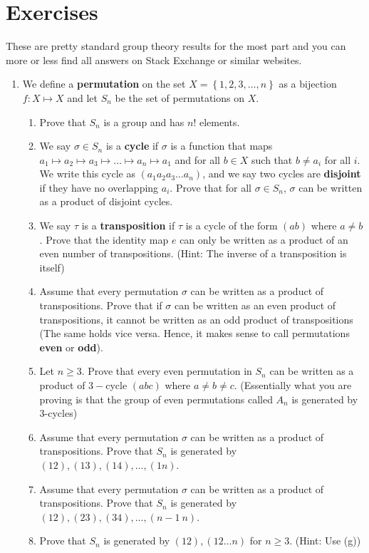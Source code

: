\documentclass[letterpaper,12pt]{article}
\newcommand{\set}[1]{\left\{ #1 \right\}}
\begin{document}
\section{Exercises}
These are pretty standard group theory results for the most part and you can more or less find all answers on Stack Exchange or similar websites.
\begin{enumerate}
    \item We define a \textbf{permutation} on the set $X=\set{1,2,3,\ldots,n}$ as a bijection $f: X \mapsto X$ and let $S_n$ be the set of permutations on $X$. \begin{enumerate}
    \item Prove that $S_n$ is a group and has $n!$ elements.
    \item We say $\sigma \in S_n$ is a \textbf{cycle} if $\sigma$ is a function that maps $a_1 \mapsto a_2 \mapsto a_3 \mapsto \ldots \mapsto a_n \mapsto a_1$ and for all $b \in X$ such that $b \neq a_i$ for all $i$. We write this cycle as $(a_1 a_2 a_3 \ldots a_n)$, and we say two cycles are \textbf{disjoint} if they have no overlapping $a_i$. Prove that for all $\sigma \in S_n$, $\sigma$ can be written as a product of disjoint cycles.
    \item We say $\tau$ is a \textbf{transposition} if $\tau$ is a cycle of the form $(ab)$ where $a \neq b$. Prove that the identity map $e$ can only be written as a product of an even number of transpositions. (Hint: The inverse of a transposition is itself)
    \item Assume that every permutation $\sigma$ can be written as a product of transpositions. Prove that if $\sigma$ can be written as an even product of transpositions, it cannot be written as an odd product of transpositions (The same holds vice versa. Hence, it makes sense to call permutations \textbf{even} or \textbf{odd}).
    \item Let $n \geq 3$. Prove that every even permutation in $S_n$ can be written as a product of $3-$cycle $(abc)$ where $a\neq b \neq c$. (Essentially what you are proving is that the group of even permutations called $A_n$ is generated by 3-cycles)
    \item Assume that every permutation $\sigma$ can be written as a product of transpositions. Prove that $S_n$ is generated by $(12),(13),(14),\ldots,(1n)$.
    \item  Assume that every permutation $\sigma$ can be written as a product of transpositions. Prove that $S_n$ is generated by $(12),(23),(34),\ldots,(n-1 \ n)$.
    \item Prove that $S_n$ is generated by $(12),(12\ldots n)$ for $n\geq 3$. (Hint: Use (g))

\end{enumerate}
\end{enumerate}
\end{document}

